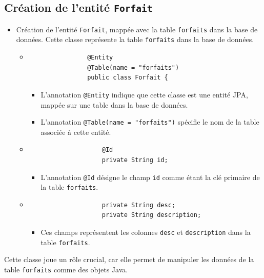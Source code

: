 \documentclass{article}
\begin{document}
	\subsection*{Création de l'entité \texttt{Forfait}}
	\begin{itemize}
		\item Création de l'entité \texttt{Forfait}, mappée avec la table \texttt{forfaits} dans la base de données. Cette classe représente la table \texttt{forfaits} dans la base de données. 	
		
		\begin{itemize}
			\item
			\begin{lstlisting}
				@Entity
				@Table(name = "forfaits")
				public class Forfait {
				\end{lstlisting}
				\begin{itemize}
					\item L'annotation \texttt{@Entity} indique que cette classe est une entité JPA, mappée sur une table dans la base de données.
					\item L'annotation \texttt{@Table(name = "forfaits")} spécifie le nom de la table associée à cette entité.
				\end{itemize}
				
				\item
				\begin{lstlisting}
					@Id
					private String id;
				\end{lstlisting}
				\begin{itemize}
					\item L'annotation \texttt{@Id} désigne le champ \texttt{id} comme étant la clé primaire de la table \texttt{forfaits}.
				\end{itemize}
				
				\item
				\begin{lstlisting}
					private String desc;
					private String description;
				\end{lstlisting}
				\begin{itemize}
					\item Ces champs représentent les colonnes \texttt{desc} et \texttt{description} dans la table \texttt{forfaits}.
				\end{itemize}
		\end{itemize}
	\end{itemize}
			
		
		Cette classe joue un rôle crucial, car elle permet de manipuler les données de la table \texttt{forfaits} comme des objets Java.
\end{document}
